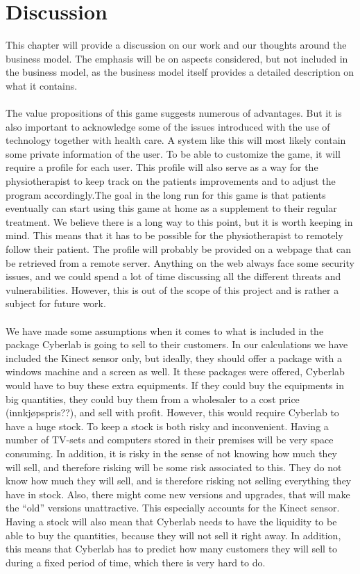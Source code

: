 \chapter{Discussion}
This chapter will provide a discussion on our work and our thoughts around the business model. The emphasis will be on aspects considered, but not included in the business model, as the business model itself provides a detailed description on what it contains. \\ \\
The value propositions of this game suggests numerous of advantages. But it is also important to acknowledge some of the issues introduced with the use of technology together with health care. A system like this will most likely contain some private information of the user. To be able to customize the game, it will require  a profile for each user. This profile will also serve as a way for the physiotherapist to keep track on the patients improvements and to adjust the program accordingly.The goal in the long run for this game is that patients eventually can start using this game at home as a supplement to their regular treatment. We believe there is a long way to this point, but it is worth keeping in mind. This means that it has to be possible for the physiotherapist to remotely follow their patient. The profile will probably be provided on a webpage that can be retrieved from a remote server. Anything on the web always face some security issues, and we could spend a lot of time discussing all the different threats and vulnerabilities. However, this is out of the scope of this project and is rather a subject for future work. \\ \\
We have made some assumptions when it comes to what is included in the package Cyberlab is going to sell to their customers. In our calculations we have included the Kinect sensor only, but ideally, they should offer a package with a windows machine and a screen as well. It these packages were offered, Cyberlab would have to buy these extra equipments. If they could buy the equipments in big quantities, they could buy them from a wholesaler to a cost price (innkjøpspris??), and sell with profit. However, this would require Cyberlab to have a huge stock. To keep a stock is both risky and inconvenient. Having a number of TV-sets and computers stored in their premises will be very space consuming. In addition, it is risky in the sense of not knowing how much they will sell, and therefore risking will be some risk associated to this. They do not know how much they will sell, and is therefore risking not selling everything they have in stock. Also, there might come new versions and upgrades, that will make the “old” versions unattractive. This especially accounts for the Kinect sensor. Having a stock will also mean that Cyberlab needs to have the liquidity to be able to buy the quantities, because they will not sell it right away. In addition, this means that Cyberlab has to predict how many customers they will sell to during a fixed period of time, which there is very hard to do. \\ \\
